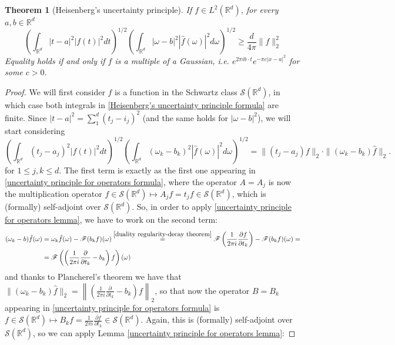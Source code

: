 \documentclass[corpo=11pt, stile=classica, tipotesi=custom,
greek, evenboxes, english]{toptesi}
\numberwithin{equation}{chapter}
\newtheorem{teo}{Theorem}[chapter] %
\newcommand{\R}{\mathbb{R}} %
\newcommand{\F}{\mathscr{F}} %
\newcommand{\pdfrac}[2]{\dfrac{\partial #1}{\partial #2}}
\newcommand{\pfrac}[2]{\frac{\partial #1}{\partial #2}}
\begin{document}
\begin{teo}[Heisenberg's uncertainty principle]\label{Heisenberg's uncertainty principle theorem}
	If $f \in L^2(\R^d)$, for every $a,b \in \R^d$
	\begin{equation}\label{Heisenberg's uncertainty principle formula}
		\left(\int_{\R^d}|t-a|^2 |f(t)|^2 dt\right)^{1/2} \left(\int_{\R^d} |\omega-b|^2 |\hat{f}(\omega)|^2 d\omega\right)^{1/2} \geq \dfrac{d}{4\pi}\| f \|_2^2
	\end{equation}
	Equality holds if and only if $f$ is a multiple of a Gaussian, i.e. $e^{2 \pi i b \cdot t}e^{-\pi c |x-a|^2}$ for some $c > 0$.
\end{teo}
\begin{proof}
	We will first consider $f$ is a function in the Schwartz class $\mathcal{S}(\R^d)$, in which case both integrals in \eqref{Heisenberg's uncertainty principle formula} are finite. Since $|t-a|^2 = \sum_1^d (t_j-i_j)^2$ (and the same holds for $|\omega-b|^2$), we will start considering
	\begin{equation*}
		\left(\int_{\R^d}(t_j-a_j)^2 |f(t)|^2 dt\right)^{1/2} \left(\int_{\R^d} (\omega_k-b_k)^2 |\hat{f}(\omega)|^2 d\omega\right)^{1/2} = \| (t_j-a_j)f\|_2 \cdot \| (\omega_k-b_k)\hat{f}\|_2.
	\end{equation*}
	for $1 \leq j,k \leq d$. The first term is exactly as the first one appearing in \eqref{uncertainty principle for operators formula}, where the operator $A=A_j$ is now the multiplication operator $f \in \mathcal{S}(\R^d) \mapsto A_jf = t_j f \in \mathcal{S}(\R^d)$, which is {\color{red} (formally)} self-adjoint over $\mathcal{S}(\R^d)$. So, in order to apply \ref{uncertainty principle for operators lemma}, we have to work on the second term:
	\begin{align*}
		(\omega_k - b) \hat{f}(\omega) &= \omega_k \hat{f}(\omega) - \F(b_k f)(\omega) \overset{\ref{duality regularity-decay theorem}}{=} \F \left(\dfrac{1}{2\pi i}\pdfrac{f}{t_k}\right) - \F(b_k f)(\omega) =\\
									   &= \F \left( \left(\dfrac{1}{2\pi i}\pdfrac{}{t_k} - b_k\right)f\right)(\omega)
	\end{align*}
	and thanks to Plancherel's theorem we have that $\|(\omega_k-b_k)\hat{f}\|_2 = \left\| \left(\frac{1}{2\pi i}\pfrac{}{t_k} - b_k\right)f\right\|_2$, so that now the operator $B=B_k$ appearing in \eqref{uncertainty principle for operators formula} is $f \in \mathcal{S}(\R^d) \mapsto B_kf = \frac{1}{2\pi i}\pfrac{f}{t_k} \in \mathcal{S}(\R^d)$. Again, this is {\color{red} (formally)} self-adjoint over $\mathcal{S}(\R^d)$, so we can apply Lemma \ref{uncertainty principle for operators lemma}:

\end{proof}
\end{document}
